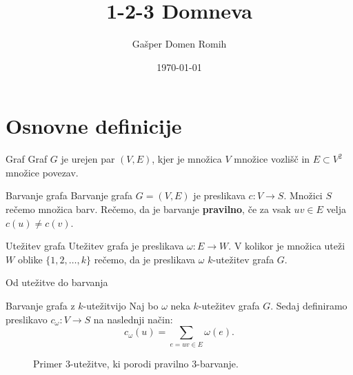 \documentclass{beamer}
\title{1-2-3 Domneva}
\author{Gašper Domen Romih}
\date{\today}
\begin{document}
\begin{frame}
	\titlepage
\end{frame}
\begin{frame}
\tableofcontents
\end{frame}
\section{Osnovne definicije}

\begin{frame}
\begin{block}{Graf}
Graf $G$ je urejen par $(V, E)$, kjer je množica $V$ množice vozlišč in $E \subset V^2$ množice povezav.
\end{block}

\begin{block}{Barvanje grafa}
	Barvanje grafa $G = (V, E)$ je preslikava $c : V \rightarrow S$. Množici $S$ rečemo množica barv. Rečemo, da je barvanje \textbf{pravilno}, če za vsak $uv \in E$ velja $c(u) \neq c(v)$.
\end{block}
\begin{block}{Utežitev grafa}
	Utežitev grafa je preslikava $\omega : E \rightarrow W$. V kolikor je množica uteži $W$ oblike $\{1,2,\ldots, k\}$ rečemo, da je preslikava $\omega$ $k$-utežitev grafa $G$.
\end{block}
\end{frame}

\begin{frame}{Od utežitve do barvanja}
\begin{block}{Barvanje grafa z $k$-utežitvijo}
	Naj bo $\omega$ neka $k$-utežitev grafa $G$. Sedaj definiramo preslikavo $c_{\omega} : V \rightarrow S$ na naslednji način:
	$$ c_{\omega}(u) = \sum_{e = uv \in E} \omega(e). $$
\end{block}
\begin{figure}
	\caption{Primer $3$-utežitve, ki porodi pravilno $3$-barvanje.}
	\label{primer}
\end{figure}

\end{frame}
\end{document}
